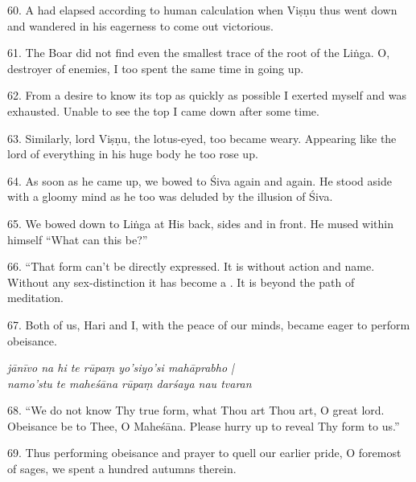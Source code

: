 60. A  had elapsed according to human calculation when Viṣṇu thus went
down and wandered in his eagerness to come out victorious.

61. The Boar did not find even the smallest trace of the root of the Liṅga. O,
destroyer of enemies, I too spent the same time in going up.

62. From a desire to know its top as quickly as possible I exerted myself and
was exhausted. Unable to see the top I came down after some time.

63. Similarly, lord Viṣṇu, the lotus-eyed, too became weary. Appearing like
the lord of everything in his huge body he too rose up.

64. As soon as he came up, we bowed to Śiva again and again. He stood aside with
a gloomy mind as he too was deluded by the illusion of Śiva.

65. We bowed down to Liṅga at His back, sides and in front. He mused within
himself “What can this be?”

66. “That form can’t be directly expressed. It is without action and name.
Without any sex-distinction it has become a . It is beyond the path
of meditation.

67. Both of us, Hari and I, with the peace of our minds, became eager to perform
obeisance.

\begin{shloka}\itshape
  jānīvo na hi te rūpaṃ yo'siyo'si mahāprabho |\\
  namo'stu te maheśāna rūpaṃ darśaya nau tvaran
\end{shloka}

68. “We do not know Thy true form, what Thou art Thou art, O great lord.
Obeisance be to Thee, O Maheśāna. Please hurry up to reveal Thy form to us.”

69. Thus performing obeisance and prayer to quell our earlier pride, O foremost
of sages, we spent a hundred autumns therein.
